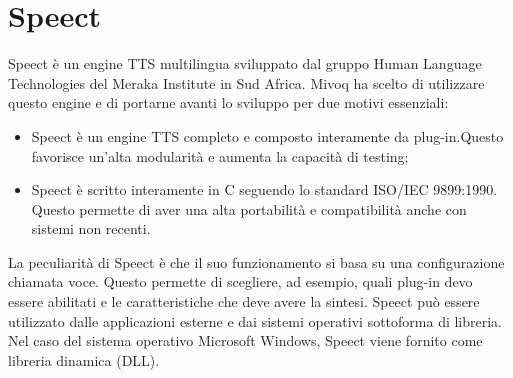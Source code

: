 \section{Speect}
Speect è un engine TTS multilingua sviluppato dal gruppo Human Language Technologies del Meraka Institute in Sud Africa. 
Mivoq ha scelto di utilizzare questo engine e di portarne avanti lo sviluppo per due motivi essenziali:
\begin{itemize}
	\item Speect è un engine TTS completo e composto interamente da plug-in.Questo favorisce un'alta modularità e aumenta la capacità di testing;
	\item Speect è scritto interamente in C seguendo lo standard ISO/IEC 9899:1990. Questo permette di aver una alta portabilità e compatibilità anche con sistemi non recenti. 
\end{itemize}
La peculiarità di Speect è che il suo funzionamento si basa su una configurazione chiamata voce. Questo permette di scegliere, ad esempio, quali plug-in devo essere abilitati e le caratteristiche che deve avere la sintesi.
Speect può essere utilizzato dalle applicazioni esterne e dai sistemi operativi sottoforma di libreria. Nel caso del sistema operativo Microsoft Windows, Speect viene fornito come libreria dinamica (DLL).
